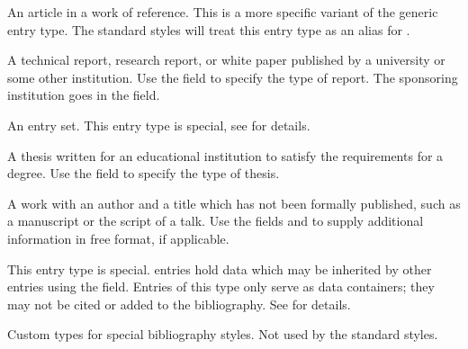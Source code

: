 \documentclass{ltxdockit}[2011/03/25]
\begin{document}
\begin{typelist}

An article in a work of reference. This is a more specific variant of the generic  entry type. The standard styles will treat this entry type as an alias for .


A technical report, research report, or white paper published by a university or some other institution. Use the  field to specify the type of report. The sponsoring institution goes in the  field.



An entry set. This entry type is special, see  for details.


A thesis written for an educational institution to satisfy the requirements for a degree. Use the  field to specify the type of thesis.



A work with an author and a title which has not been formally published, such as a manuscript or the script of a talk. Use the fields  and  to supply additional information in free format, if applicable.



This entry type is special.  entries hold data which may be inherited by other entries using the  field. Entries of this type only serve as data containers; they may not be cited or added to the bibliography. See  for details.


Custom types for special bibliography styles. Not used by the standard styles.

\end{typelist}
\end{document}

